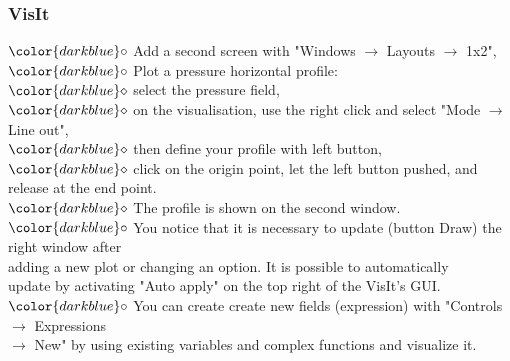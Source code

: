 \documentclass[10pt, hyperref={unicode=true,pdfusetitle, bookmarks=true,bookmarksnumbered=false,bookmarksopen=false, breaklinks=false,pdfborder={0 0l 1},backref=true,colorlinks=true,linkcolor=darkblue,pageanchor}]{beamer}
\begin{document}
\begin{frame}
\frametitle{VisIt}
\begin{block}{}

\hspace{1cm} $\color{darkblue}\circ$ {\small{Add a second screen with "Windows $\rightarrow$ Layouts $\rightarrow$ 1x2",}}\\

\hspace{1cm} $\color{darkblue}\circ$ {\small{Plot a pressure horizontal profile:\\}}
\hspace{1.5cm} $\color{darkblue}\diamond$ {\footnotesize{ select the pressure field,}} \\ 
\hspace{1.5cm} $\color{darkblue}\diamond$ {\footnotesize{ on the visualisation, use the right click and select "Mode $\rightarrow$ Line out",}}\\
\hspace{1.5cm} $\color{darkblue}\diamond$ {\footnotesize{ then define your profile with left button,}} \\
\hspace{1.5cm} $\color{darkblue}\diamond$ {\footnotesize{ click on the origin point, let the left button pushed, and release at the end point.}}\\
\hspace{1.5cm} $\color{darkblue}\diamond$ {\footnotesize{ The profile is shown on the second window.}}\\

\hspace{1cm} $\color{darkblue}\circ$ {\small{You notice that it is necessary to update (button Draw) the right window after \\
\hspace{1.3cm} adding a new plot or changing an option. It is possible to automatically \\
\hspace{1.3cm} update by activating "Auto apply" on the top right of the VisIt's GUI.}}\\

\hspace{1cm} $\color{darkblue}\circ$ {\small{You can create create new fields (expression) with "Controls $\rightarrow$ Expressions \\
\hspace{1.3cm} $\rightarrow$ New" by using existing variables and complex functions and visualize it.}}\\


\end{block}
\end{frame}
\end{document}
